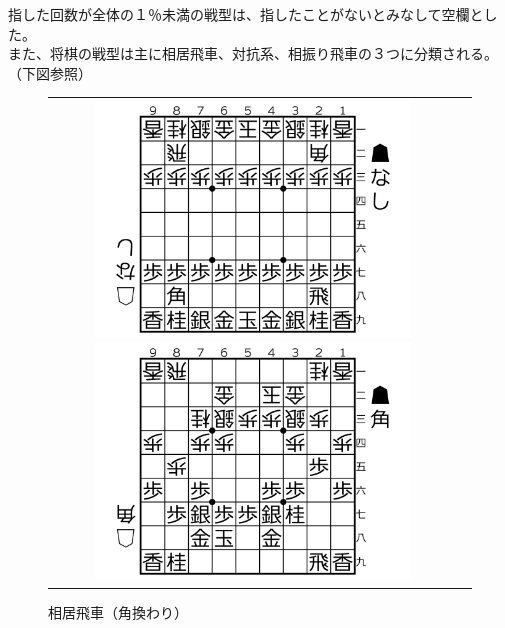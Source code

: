 \documentclass[11pt,a4paper,dvipdfmx]{jsarticle}
\begin{document}
指した回数が全体の１％未満の戦型は、指したことがないとみなして空欄とした。
\\
また、将棋の戦型は主に相居飛車、対抗系、相振り飛車の３つに分類される。（下図参照）
\\
\begin{figure}[h]
    \begin{tabular}{cc}
        \begin{minipage}[t]{0.47\hsize}
            \centering
            \includegraphics[width=0.8\textwidth]{graph/shoki.png}
            \caption{初期配置}
        \end{minipage}
        \begin{minipage}[t]{0.47\hsize}
            \centering
            \includegraphics[width=0.8\textwidth]{graph/kk.png}
            \caption{相居飛車（角換わり）}
        \end{minipage}
    \end{tabular}
\end{figure}
\\
\end{document}
